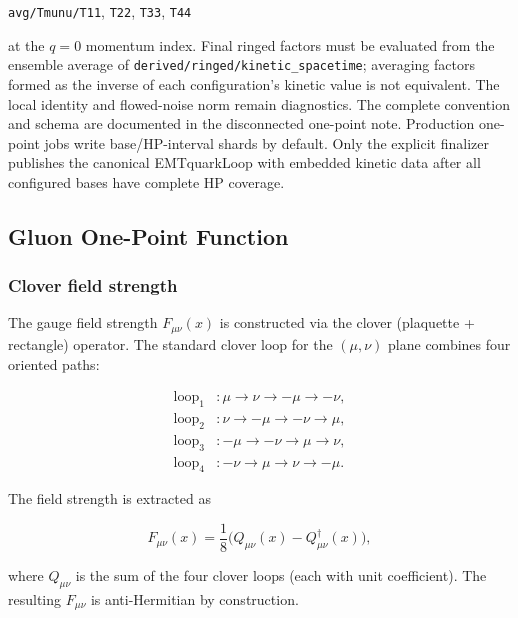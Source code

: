 \documentclass[11pt,a4paper]{article}
\newcommand{\code}[1]{\texttt{#1}}
\begin{document}
\begin{center}
\code{avg/Tmunu/T11}, \code{T22}, \code{T33}, \code{T44}
\end{center}

at the \(q=0\) momentum index.  Final ringed factors must be evaluated from the
ensemble average of \code{derived/ringed/kinetic\_spacetime}; averaging factors formed as
the inverse of each configuration's kinetic value is not equivalent.  The
local identity and flowed-noise norm remain diagnostics.  The complete
convention and schema are documented in the disconnected one-point note.
Production one-point jobs write base/HP-interval shards by default.  Only the
explicit finalizer publishes the canonical EMTquarkLoop with embedded kinetic data after
all configured bases have complete HP coverage.

\subsection{Gluon One-Point Function}
\label{sec:gluon1pt}

\subsubsection{Clover field strength}

The gauge field strength $F_{\mu\nu}(x)$ is constructed via the clover (plaquette + rectangle) operator. The standard clover loop for the $(\mu,\nu)$ plane combines four oriented paths:

\begin{equation}\label{eq:clover_loops}
  \begin{aligned}
    \text{loop}_1 &: \mu \to \nu \to -\mu \to -\nu, \\
    \text{loop}_2 &: \nu \to -\mu \to -\nu \to \mu, \\
    \text{loop}_3 &: -\mu \to -\nu \to \mu \to \nu, \\
    \text{loop}_4 &: -\nu \to \mu \to \nu \to -\mu.
  \end{aligned}
\end{equation}

The field strength is extracted as

\begin{equation}\label{eq:F_clover}
  F_{\mu\nu}(x) = \frac{1}{8}\Big(
    Q_{\mu\nu}(x) - Q_{\mu\nu}^\dagger(x)
  \Big),
\end{equation}

where $Q_{\mu\nu}$ is the sum of the four clover loops (each with unit coefficient). The resulting $F_{\mu\nu}$ is anti-Hermitian by construction.
\end{document}
